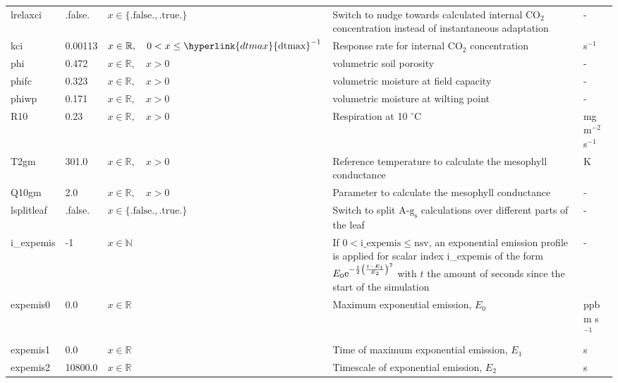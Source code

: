 \documentclass[twoside,11pt,fleqn,a4paper,english,openright]{report}
\begin{document}
\begin{center}
\begin{supertabular}{|l|p{1.6cm}|p{3.5cm}|p{6cm}|l|}
  lrelaxci	& .false. & $x\in\{\text{.false.},\text{.true.}\}$  & Switch to nudge towards calculated internal CO$_2$ concentration instead of instantaneous adaptation & - \\ 
  kci		& 0.00113 & $x \in \mathbb{R}, \quad 0 < x \le \hyperlink{dtmax}{\text{dtmax}}^{-1}$	& Response rate for internal CO$_2$ concentration	& s$^{-1}$\\
  phi		& 0.472	& $x \in \mathbb{R}, \quad x > 0$	& volumetric soil porosity & - \\
  phifc		& 0.323	& $x \in \mathbb{R}, \quad x > 0$	& volumetric moisture at field capacity & - \\
  phiwp		& 0.171	& $x \in \mathbb{R}, \quad x > 0$	& volumetric moisture at wilting point & - \\
  R10		& 0.23	& $x \in \mathbb{R}, \quad x > 0$	& Respiration at 10 $^{\circ}$C & mg m$^{-2}$ s$^{-1}$ \\
  T2gm		& 301.0	& $x \in \mathbb{R}, \quad x > 0$	& Reference temperature to calculate the mesophyll conductance & K \\
  Q10gm		& 2.0	& $x \in \mathbb{R}, \quad x > 0$	& Parameter to calculate the mesophyll conductance & - \\
  lsplitleaf 	& .false. &  $x\in\{\text{.false.},\text{.true.}\}$  & Switch to split $\text{A-}\text{g}_\text{s}$ calculations over different parts of the leaf  & - \\
  i\_expemis	& -1 	& $x \in \mathbb{N}$			& If $0 < \text{i\_expemis} \leq \text{nsv}$, an exponential emission profile is applied for scalar index i\_expemis of the form $ E_0 {\rm e}^{-\frac{1}{2} \left(\frac{t-E_1}{E_2}\right)^2 } $ with $t$ the amount of seconds since the start of the simulation & - \\
  expemis0	& 0.0	& $x \in \mathbb{R}$			& Maximum exponential emission, $E_0$ & ppb m s$^{-1}$ \\
  expemis1	& 0.0	& $x \in \mathbb{R}$			& Time of maximum exponential emission, $E_1$ & s \\
  expemis2	& 10800.0 & $x \in \mathbb{R}$			& Timescale of exponential emission, $E_2$ & s \\
\end{supertabular}


\end{center}

\newpage
\end{document}
